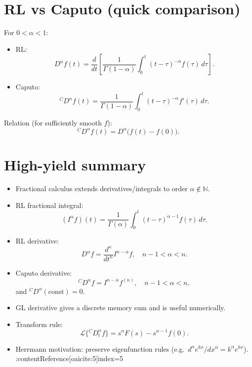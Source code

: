 
\section{RL vs Caputo (quick comparison)}

For $0<\alpha<1$:
\begin{itemize}
\item RL:
\[
D^\alpha f(t)=\frac{d}{dt}\left[\frac{1}{\Gamma(1-\alpha)}\int_0^t (t-\tau)^{-\alpha}f(\tau)\,d\tau\right].
\]
\item Caputo:
\[
{}^{C}D^\alpha f(t)=\frac{1}{\Gamma(1-\alpha)}\int_0^t (t-\tau)^{-\alpha}f'(\tau)\,d\tau.
\]
\end{itemize}

Relation (for sufficiently smooth $f$):
\begin{equation}
{}^{C}D^\alpha f(t)
=
D^\alpha\big(f(t)-f(0)\big).
\end{equation}


\section{High-yield summary}

\begin{itemize}
\item Fractional calculus extends derivatives/integrals to order $\alpha\notin\mathbb{N}$.
\item RL fractional integral:
\[
(I^\alpha f)(t)=\frac{1}{\Gamma(\alpha)}\int_0^t (t-\tau)^{\alpha-1}f(\tau)\,d\tau.
\]
\item RL derivative:
\[
D^\alpha f=\frac{d^n}{dt^n}I^{n-\alpha}f,\quad n-1<\alpha<n.
\]
\item Caputo derivative:
\[
{}^{C}D^\alpha f=I^{n-\alpha}f^{(n)},\quad n-1<\alpha<n,
\]
and ${}^{C}D^\alpha(\text{const})=0$.
\item GL derivative gives a discrete memory sum and is useful numerically.
\item Transform rule:
\[
\mathcal{L}\{{}^{C}D_t^\alpha f\}=s^\alpha F(s)-s^{\alpha-1}f(0).
\]
\item Herrmann motivation: preserve eigenfunction rules
(e.g.\ $d^\alpha e^{kx}/dx^\alpha=k^\alpha e^{kx}$). :contentReference[oaicite:5]{index=5}
\end{itemize}
